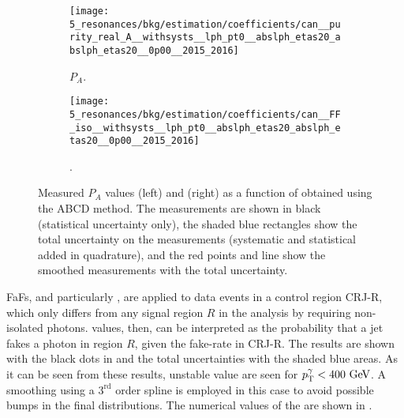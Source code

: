 \begin{figure}[ht!]
    \centering
    \begin{subfigure}[h]{0.49\linewidth}
        \centering
        \texttt{[image: 5\_resonances/bkg/estimation/coefficients/can\_\_purity\_real\_A\_\_withsysts\_\_lph\_pt0\_\_abslph\_etas20\_abslph\_etas20\_\_0p00\_\_2015\_2016]}
        \caption{\(P_A\).}
        \label{fig:bkg:estimation:results:results:purities}
    \end{subfigure}
    \hfill
    \begin{subfigure}[h]{0.49\linewidth}
        \centering
        \texttt{[image: 5\_resonances/bkg/estimation/coefficients/can\_\_FF\_iso\_\_withsysts\_\_lph\_pt0\_\_abslph\_etas20\_abslph\_etas20\_\_0p00\_\_2015\_2016]}
        \caption{\ffiso.}
        \label{fig:bkg:estimation:results:results:ffiso}
    \end{subfigure}
    \caption{Measured \gammajet \(P_A\) values (left) and \ffiso (right) as a function of \ptgam obtained using the ABCD method. The measurements are shown in black (statistical uncertainty only), the shaded blue rectangles show the total uncertainty on the measurements (systematic and statistical added in quadrature), and the red points and line show the smoothed measurements with the total uncertainty.}
    \label{fig:bkg:estimation:results:results}
\end{figure}


\acp{FaF}, and particularly \ffiso, are applied to data events in a control region CRJ-R, which only differs from any signal region \(R\) in the analysis by requiring non-isolated photons. \ffiso values, then, can be interpreted as the probability that a jet fakes a photon in region \(R\), given the fake-rate in CRJ-R. The results are shown with the black dots in \Fig{\ref{fig:bkg:estimation:results:results:ffiso}} and the total uncertainties with the shaded blue areas. As it can be seen from these results, unstable \ffiso value are seen for \(p_{\text{T}}^{\gamma}<400~\text{GeV}\).
A smoothing using a \(3^{\text{rd}}\) order spline is employed in this case to avoid possible bumps in the final distributions. The numerical values of the \ffiso are shown in \Tab{\ref{tab:bkg:estimation:results:ffiso_purity_values}}.